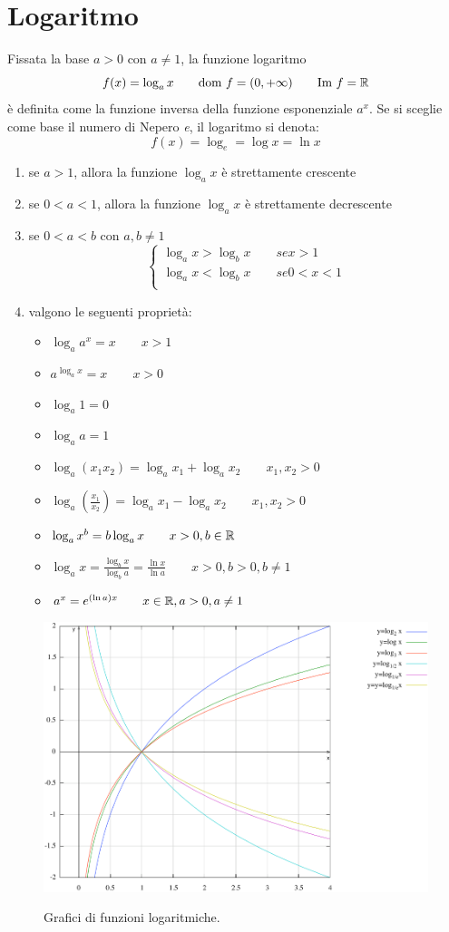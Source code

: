\section{Logaritmo}
Fissata la base $a>0$ con $a\neq 1$, la funzione logaritmo
\[f(x)=\log_a x \qquad \text{dom } f = (0,+\infty) \qquad \text{Im } f = \mathbb{R}\]
è definita come la funzione inversa della funzione esponenziale $a^x$. Se si sceglie come base il numero di Nepero \textit{e}, il logaritmo si denota:
\[f(x)=\log_e = \log x = \ln x\]

\begin{enumerate}
	\item se $a>1$, allora la funzione $\log_a x$ è strettamente crescente
	\item se $0<a<1$, allora la funzione $\log_a x$ è strettamente decrescente
	\item se $0<a<b$ con $a,b\neq 1$
	\[\begin{cases}
	\log_a x > \log_b x \qquad se x>1 \\
	\log_a x < \log_b x \qquad se 0<x<1 \\
	\end{cases}\]
	\item valgono le seguenti proprietà:
	\begin{itemize}
		\item $\log_a a^x = x \qquad x>1$
		\item $a^{\log_a x}=x \qquad x>0$
		\item $\log_a 1 = 0$
		\item $\log_a a = 1$
		\item $\log_a (x_1 x_2)= \log_a x_1 + \log_a x_2 \qquad x_1,x_2 > 0$
		\item $\log_a (\frac{x_1}{x_2})=\log_a x_1 - \log_a x_2 \qquad x_1,x_2 > 0$
		\item $\log_a x^b = b \log_a x \qquad x>0, b \in \mathbb{R}$
		\item $\log_a x= \frac{\log_b x}{\log_b a}=\frac{\ln x}{\ln a}\qquad x>0,b>0,b\neq 1$
		\item $a^x = e^{(\ln a)x} \qquad x\in \mathbb{R}, a>0, a \neq 1$
	\end{itemize}
\end{enumerate}

\begin{figure}[H]
{\includegraphics[width=.9\linewidth]{gfx/3/logaritmi.png}}
\caption{Grafici di funzioni logaritmiche.}\label{fig:logaritmi}
\end{figure}